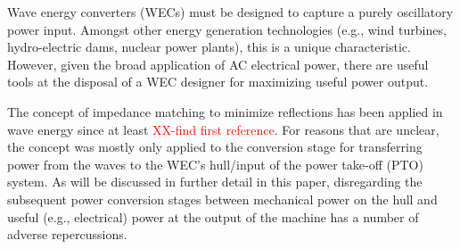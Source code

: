\documentclass[lettersize,journal]{IEEEtran}
\newcommand{\rc}[1]{\textcolor{red}{#1}}
\begin{document}


Wave energy converters (WECs) must be designed to capture a purely oscillatory power input.
Amongst other energy generation technologies (e.g., wind turbines, hydro-electric dams, nuclear power plants), this is a unique characteristic.
However, given the broad application of AC electrical power, there are useful tools at the disposal of a WEC designer for maximizing useful power output.

The concept of impedance matching to minimize reflections has been applied in wave energy since at least \rc{XX-find first reference}.
For reasons that are unclear, the concept was mostly only applied to the conversion stage for transferring power from the waves to the WEC's hull/input of the power take-off (PTO) system.
As will be discussed in further detail in this paper, disregarding the subsequent power conversion stages between mechanical power on the hull and useful (e.g., electrical) power at the output of the machine has a number of adverse repercussions.
\end{document}

